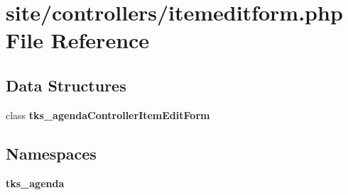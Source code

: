 \section{site/controllers/itemeditform.php File Reference}
\label{controllers_2itemeditform_8php}
\subsection*{Data Structures}
\begin{DoxyCompactItemize}
\item 
class \textbf{ tks\+\_\+agenda\+Controller\+Item\+Edit\+Form}
\end{DoxyCompactItemize}
\subsection*{Namespaces}
\begin{DoxyCompactItemize}
\item 
 \textbf{ tks\+\_\+agenda}
\end{DoxyCompactItemize}
